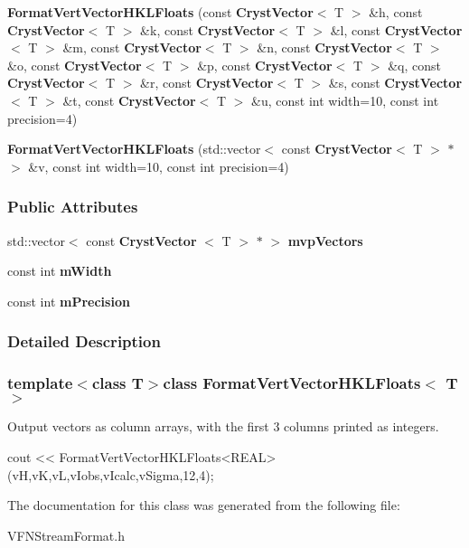 \begin{DoxyCompactItemize}
\item 
{\bfseries \-Format\-Vert\-Vector\-H\-K\-L\-Floats} (const {\bf \-Cryst\-Vector}$<$ \-T $>$ \&h, const {\bf \-Cryst\-Vector}$<$ \-T $>$ \&k, const {\bf \-Cryst\-Vector}$<$ \-T $>$ \&l, const {\bf \-Cryst\-Vector}$<$ \-T $>$ \&m, const {\bf \-Cryst\-Vector}$<$ \-T $>$ \&n, const {\bf \-Cryst\-Vector}$<$ \-T $>$ \&o, const {\bf \-Cryst\-Vector}$<$ \-T $>$ \&p, const {\bf \-Cryst\-Vector}$<$ \-T $>$ \&q, const {\bf \-Cryst\-Vector}$<$ \-T $>$ \&r, const {\bf \-Cryst\-Vector}$<$ \-T $>$ \&s, const {\bf \-Cryst\-Vector}$<$ \-T $>$ \&t, const {\bf \-Cryst\-Vector}$<$ \-T $>$ \&u, const int width=10, const int precision=4)\label{a00033_a565928926675ff9bda3642f99121cc61}

\item 
{\bfseries \-Format\-Vert\-Vector\-H\-K\-L\-Floats} (std\-::vector$<$ const {\bf \-Cryst\-Vector}$<$ \-T $>$ $\ast$ $>$ \&v, const int width=10, const int precision=4)\label{a00033_a9be8620f71ff33ec8488c88c65c4cf02}

\end{DoxyCompactItemize}
\subsubsection*{\-Public \-Attributes}
\begin{DoxyCompactItemize}
\item 
std\-::vector$<$ const {\bf \-Cryst\-Vector}\*
$<$ \-T $>$ $\ast$ $>$ {\bfseries mvp\-Vectors}\label{a00033_adf1d4ac745168890122eb8258a15d2c7}

\item 
const int {\bfseries m\-Width}\label{a00033_a47d65c09249a2efaacfc37c490f25115}

\item 
const int {\bfseries m\-Precision}\label{a00033_a82aa77621492dcd761a755c9d707cb9e}

\end{DoxyCompactItemize}


\subsubsection{\-Detailed \-Description}
\subsubsection*{template$<$class T$>$class Format\-Vert\-Vector\-H\-K\-L\-Floats$<$ T $>$}

\-Output vectors as column arrays, with the first 3 columns printed as integers. 


\begin{DoxyCode}
 cout << FormatVertVectorHKLFloats<REAL>(vH,vK,vL,vIobs,vIcalc,vSigma,12,4);
\end{DoxyCode}
 

\-The documentation for this class was generated from the following file\-:\begin{DoxyCompactItemize}
\item 
\-V\-F\-N\-Stream\-Format.\-h\end{DoxyCompactItemize}
